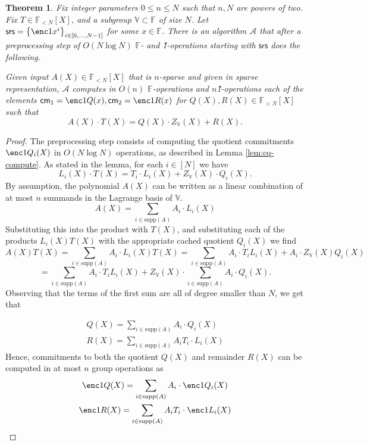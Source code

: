 \documentclass[11pt]{article} %
\newcommand{\alg}{\ensuremath{\mathscr{A}}\xspace}
\newcommand{\F}{\ensuremath{\mathbb F}\xspace}
\newcommand{\srs}{\ensuremath{\mathsf{srs}}\xspace}
\newcommand{\cm}{\ensuremath{\mathsf{cm}}\xspace}
\newcommand{\sett}[2]{\ensuremath{\set{#1}_{#2}}\xspace}
\newcommand{\set}[1]{\ensuremath{\left\{#1\right\}}\xspace}
\newcommand{\polysofdeg}[1]{\ensuremath{\F_{< #1}[X]}\xspace}
\newtheorem{thm}[lemma]{Theorem}
\newcommand{\bigspace}{\ensuremath{\mathbb{V}}\xspace}
\newcommand{\witsize}{\ensuremath{n}\xspace}
\newcommand{\tabsize}{\ensuremath{N}\xspace}
\newcommand{\tabruntime}{\ensuremath{\tabsize\log\tabsize}\xspace}
\newcommand{\supp}[1]{\ensuremath{\mathrm{supp}(#1)}\xspace}
\begin{document}
\begin{thm}\label{thm:sec3main}
Fix integer parameters $0\leq n\leq N$ such that $n,N$ are powers of two. Fix $T\in \polysofdeg{\tabsize}$, and a subgroup $\bigspace\subset \F$ of size \tabsize. Let $\srs=\sett{\enc1{x^i}}{i\in[0,\ldots,\tabsize-1]}$ for some $x\in \F$. 
There is an algorithm \alg that after a preprocessing step of $O(\tabruntime)$ \F- and \G1-operations starting with \srs does the following.


Given input $A(X)\in \polysofdeg{\tabsize}$ that is \witsize-sparse and given in sparse representation, \alg computes in 
$O(\witsize)$ \F-operations and \witsize \G1-operations each of the elements
$\cm_1=\enc1{Q(x)},\cm_2=\enc1{R(x)}$ for $Q(X),R(X)\in \polysofdeg{\tabsize}$ such that
\[A(X)\cdot T(X) = Q(X)\cdot Z_{\bigspace}(X) + R(X).\]
\end{thm}
\begin{proof}
    The preprocessing step consists of computing the quotient commitments $\enc1{Q_i(X)}$ in $O(\tabruntime)$ operations, as described in Lemma \ref{lem:cq-compute}. As stated in the lemma,
    for each $i\in[\tabsize]$ we have
    \[L_i(X)\cdot T(X)=T_i\cdot L_i(X) + Z_\bigspace(X)\cdot Q_i(X).\]
    By assumption, the polynomial $A(X)$ can be written as a linear combination of
    at most $\witsize$ summands in the Lagrange basis of $\bigspace$.
    \[ A(X) = \sum_{i \in \supp{A}} A_i\cdot L_i(X) \]
    Substituting this into the product with $T(X)$, and substituting each of the products
    $L_i(X) T(X)$ with the appropriate cached quotient $Q_i(X)$ we find
    \[ A(X) T(X) = \sum_{i\in \supp{A}} A_i\cdot  L_i(X) T(X) =\sum_{i \in
    \supp{A}} A_i \cdot T_i L_i(X) + A_i\cdot Z_\bigspace(X) Q_i(X) \] 
   \[=\sum_{i \in  \supp{A}} A_i \cdot T_i L_i(X) +Z_\bigspace(X)\cdot \sum_{i \in
    \supp{A}} A_i \cdot Q_i(X).\] 
Observing that the terms of the first sum are all of degree smaller than \tabsize, we get that

    \begin{gather*}
Q(X)=\sum_{i \in  \supp{A}} A_i \cdot Q_i(X) \\
        R(X) = \sum_{i \in \supp{A}} A_i T_i \cdot L_i(X)
    \end{gather*}
    Hence, commitments to both the quotient $Q(X)$ and remainder $R(X)$ can be computed in
   at most \witsize group operations as 
    \begin{gather*}
        \enc1{Q(X)} = \sum_{i \in \supp{A}} A_i \cdot \enc1{Q_i(X)} \\
        \enc1{R(X)} = \sum_{i \in \supp{A}} A_i T_i \cdot \enc1{L_i(X)}
    \end{gather*}
\end{proof}
\end{document}
